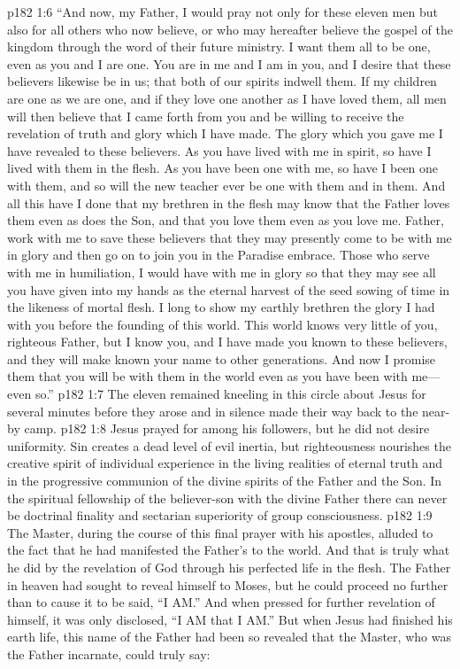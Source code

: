 \vs p182 1:6 \textcolor{ubdarkred}{“And now, my Father, I would pray not only for these eleven men but also for all others who now believe, or who may hereafter believe the gospel of the kingdom through the word of their future ministry. I want them all to be one, even as you and I are one. You are in me and I am in you, and I desire that these believers likewise be in us; that both of our spirits indwell them. If my children are one as we are one, and if they love one another as I have loved them, all men will then believe that I came forth from you and be willing to receive the revelation of truth and glory which I have made. The glory which you gave me I have revealed to these believers. As you have lived with me in spirit, so have I lived with them in the flesh. As you have been one with me, so have I been one with them, and so will the new teacher ever be one with them and in them. And all this have I done that my brethren in the flesh may know that the Father loves them even as does the Son, and that you love them even as you love me. Father, work with me to save these believers that they may presently come to be with me in glory and then go on to join you in the Paradise embrace. Those who serve with me in humiliation, I would have with me in glory so that they may see all you have given into my hands as the eternal harvest of the seed sowing of time in the likeness of mortal flesh. I long to show my earthly brethren the glory I had with you before the founding of this world. This world knows very little of you, righteous Father, but I know you, and I have made you known to these believers, and they will make known your name to other generations. And now I promise them that you will be with them in the world even as you have been with me---even so.”}\plusone
\vs p182 1:7 The eleven remained kneeling in this circle about Jesus for several minutes before they arose and in silence made their way back to the near\hyp{}by camp.
\pc \vs p182 1:8 Jesus prayed for  among his followers, but he did not desire uniformity. Sin creates a dead level of evil inertia, but righteousness nourishes the creative spirit of individual experience in the living realities of eternal truth and in the progressive communion of the divine spirits of the Father and the Son. In the spiritual fellowship of the believer\hyp{}son with the divine Father there can never be doctrinal finality and sectarian superiority of group consciousness.
\vs p182 1:9 The Master, during the course of this final prayer with his apostles, alluded to the fact that he had manifested the Father’s  to the world. And that is truly what he did by the revelation of God through his perfected life in the flesh. The Father in heaven had sought to reveal himself to Moses, but he could proceed no further than to cause it to be said, “I AM.” And when pressed for further revelation of himself, it was only disclosed, “I AM that I AM.” But when Jesus had finished his earth life, this name of the Father had been so revealed that the Master, who was the Father incarnate, could truly say:\plusone
